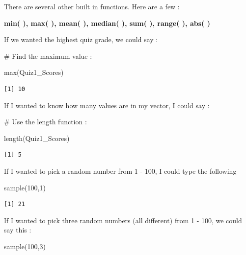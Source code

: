 \documentclass[
  letterpaper,
  DIV=11,
  numbers=noendperiod]{scrreprt}
\newenvironment{Shaded}{\begin{snugshade}}{\end{snugshade}}
\newcommand{\CommentTok}[1]{\textcolor[rgb]{0.37,0.37,0.37}{#1}}
\newcommand{\DecValTok}[1]{\textcolor[rgb]{0.68,0.00,0.00}{#1}}
\newcommand{\FunctionTok}[1]{\textcolor[rgb]{0.28,0.35,0.67}{#1}}
\newcommand{\NormalTok}[1]{\textcolor[rgb]{0.00,0.23,0.31}{#1}}
\begin{document}
There are several other built in functions. Here are a few :

\textbf{min( ), max( ), mean( ), median( ), sum( ), range( ), abs( )}

If we wanted the highest quiz grade, we could say :

\begin{Shaded}
\begin{Highlighting}[]
\CommentTok{\# Find the maximum value :}

\FunctionTok{max}\NormalTok{(Quiz1\_Scores)}
\end{Highlighting}
\end{Shaded}

\begin{verbatim}
[1] 10
\end{verbatim}

If I wanted to know how many values are in my vector, I could say :

\begin{Shaded}
\begin{Highlighting}[]
\CommentTok{\# Use the length function :}

\FunctionTok{length}\NormalTok{(Quiz1\_Scores)}
\end{Highlighting}
\end{Shaded}

\begin{verbatim}
[1] 5
\end{verbatim}

If I wanted to pick a random number from 1 - 100, I could type the
following

\begin{Shaded}
\begin{Highlighting}[]
\FunctionTok{sample}\NormalTok{(}\DecValTok{100}\NormalTok{,}\DecValTok{1}\NormalTok{)}
\end{Highlighting}
\end{Shaded}

\begin{verbatim}
[1] 21
\end{verbatim}

If I wanted to pick three random numbers (all different) from 1 - 100,
we could say this :

\begin{Shaded}
\begin{Highlighting}[]
\FunctionTok{sample}\NormalTok{(}\DecValTok{100}\NormalTok{,}\DecValTok{3}\NormalTok{)}
\end{Highlighting}
\end{Shaded}
\end{document}
